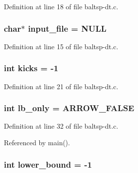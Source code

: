 Definition at line 18 of file baltsp-dt.c.\hypertarget{bin_2baltsp-dt_8c_a4f3a15de34c409bdec6ceacf93078ed}{
\subsubsection[{input\_\-file}]{\setlength{\rightskip}{0pt plus 5cm}char$\ast$ {\bf input\_\-file} = NULL}}
\label{bin_2baltsp-dt_8c_a4f3a15de34c409bdec6ceacf93078ed}




Definition at line 15 of file baltsp-dt.c.\hypertarget{bin_2baltsp-dt_8c_b8f057ba1ad6b7f0c46f8140b25b3467}{
\subsubsection[{kicks}]{\setlength{\rightskip}{0pt plus 5cm}int {\bf kicks} = -1}}
\label{bin_2baltsp-dt_8c_b8f057ba1ad6b7f0c46f8140b25b3467}




Definition at line 21 of file baltsp-dt.c.\hypertarget{bin_2baltsp-dt_8c_f328dea7847a1b1888dc14a570d0ec45}{
\subsubsection[{lb\_\-only}]{\setlength{\rightskip}{0pt plus 5cm}int {\bf lb\_\-only} = ARROW\_\-FALSE}}
\label{bin_2baltsp-dt_8c_f328dea7847a1b1888dc14a570d0ec45}




Definition at line 32 of file baltsp-dt.c.

Referenced by main().\hypertarget{bin_2baltsp-dt_8c_ed7394fd8e0c2796b26b9654fd10fd9d}{
\subsubsection[{lower\_\-bound}]{\setlength{\rightskip}{0pt plus 5cm}int {\bf lower\_\-bound} = -1}}
\label{bin_2baltsp-dt_8c_ed7394fd8e0c2796b26b9654fd10fd9d}




